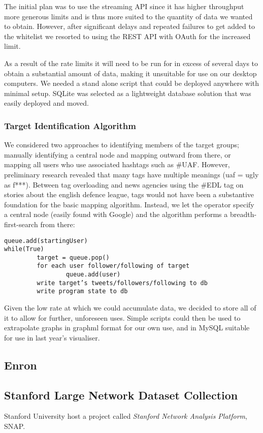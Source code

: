 The initial plan was to use the streaming API since it has higher throughput more generous limits and is thus more suited to the quantity of data we wanted to obtain. However, after significant delays and repeated failures to get added to the whitelist we resorted to using the REST API with OAuth for the increased limit.

As a result of the rate limits it will need to be run for in excess of several days to obtain a substantial amount of data, making it unsuitable for use on our desktop computers. We needed a stand alone script that could be deployed anywhere with minimal setup. SQLite was selected as a lightweight database solution that was easily deployed and moved.

\subsubsection{Target Identification Algorithm}
We considered two approaches to identifying members of the target groups; manually identifying a central node and mapping outward from there, or mapping all users who use associated hashtags such as #UAF. However, preliminary research revealed that many tags have multiple meanings (uaf = ugly as f***). Between tag overloading and news agencies using the #EDL tag on stories about the english defence league, tags would not have been a substantive foundation for the basic mapping algorithm. Instead, we let the operator specify a central node (easily found with Google) and the algorithm performs a breadth-first-search from there:

\begin{verbatim}
queue.add(startingUser)
while(True)
         target = queue.pop()
         for each user follower/following of target
                 queue.add(user)
         write target’s tweets/followers/following to db
         write program state to db
\end{verbatim}

Given the low rate at which we could accumulate data, we decided to store all of it to allow for further, unforeseen uses. Simple scripts could then be used to extrapolate graphs in graphml format for our own use, and in MySQL suitable for use in last year’s visualiser.

\subsection{Enron}

\subsection{Stanford Large Network Dataset Collection}
Stanford University host a project called \emph{Stanford Network Analysis Platform}, SNAP.

